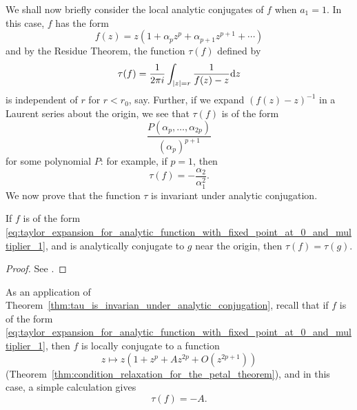 We shall now briefly consider the local analytic conjugates of $f$ when $a_1 =
1$. In this case, $f$ has the form
\begin{equation}
    \label{eq:taylor_expansion_for_analytic_function_with_fixed_point_at_0_and_multiplier_1}
    f(z) = z(1 + \alpha_p z^p + \alpha_{p+1} z^{p+1} + \cdots)
\end{equation}
and by the Residue Theorem, the function $\tau(f)$ defined by
\begin{equation*}
    \tau(f) = \frac{1}{2\pi i} \int_{|z|=r} \frac{1}{f(z) - z} \mathrm{d} z
\end{equation*}
is independent of $r$ for $r < r_0$, say. Further, if we expand $(f(z) -
z)^{-1}$ in a Laurent series about the origin, we see that $\tau(f)$ is of the
form
\begin{equation*}
    \frac{P(\alpha_p, \dots, \alpha_{2p})}{(\alpha_p)^{p+1}}
\end{equation*}
for some polynomial $P$: for example, if $p = 1$, then
\begin{equation*}
    \tau(f) = -\frac{\alpha_2}{\alpha_1^2}.
\end{equation*}
We now prove that the function $\tau$ is invariant under analytic conjugation.

\begin{theorem}
    \label{thm:tau_is_invarian_under_analytic_conjugation}
    If $f$ is of the form
    \eqref{eq:taylor_expansion_for_analytic_function_with_fixed_point_at_0_and_multiplier_1},
    and is analytically conjugate to $g$ near the origin, then $\tau(f) =
    \tau(g)$.
\end{theorem}
\begin{proof}
    See \cite[153--154]{Beardon1991}.
\end{proof}

As an application of
Theorem~\ref{thm:tau_is_invarian_under_analytic_conjugation}, recall that if $f$
is of the form
\eqref{eq:taylor_expansion_for_analytic_function_with_fixed_point_at_0_and_multiplier_1},
then $f$ is locally conjugate to a function
\begin{equation}
    \label{eq:taylor_expansion_for_conjugate_of_analytic_function_with_fixed_point_at_0_and_multiplier_1}
    z \mapsto z(1 + z^p + Az^{2p} + O(z^{2p+1}))
\end{equation}
(Theorem~\ref{thm:condition_relaxation_for_the_petal_theorem}), and in this
case, a simple calculation gives
\begin{equation*}
    \tau(f) = -A.
\end{equation*}

